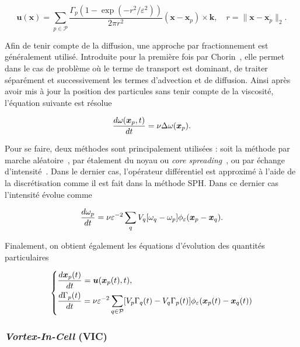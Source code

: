 \begin{equation*}
    \bm u(\bm x) = \sum_{p \in \mathcal P} \frac{\Gamma_p(1 - \exp(-r^2 / \varepsilon^2)) }{2\pi r^2} (\bm x - \bm x_p)\times \bm k, \quad r = \|\bm x - \bm x_p\|_2.
\end{equation*}

Afin de tenir compte de la diffusion, une approche par fractionnement est généralement utilisé. Introduite pour la première fois par Chorin~\cite{chorin_discretization_1973}, elle permet dans le cas de problème où le terme de transport est dominant, de traiter séparément et successivement les termes d'advection et de diffusion. Ainsi après avoir mis à jour la position des particules sans tenir compte de la viscosité, l'équation suivante est résolue

\begin{equation*}
    \frac{d\omega(\bm x_p, t)}{dt} = \nu \Delta \omega(\bm{x}_p).
\end{equation*}

Pour se faire, deux méthodes sont principalement utilisées : soit la méthode par marche aléatoire~\cite{chorin_discretization_1973}, par étalement du noyau ou \textit{core spreading}~\cite{LEONARD1980289}, ou par échange d'intensité~\cite{1989MaCom..53..485D}. Dans le dernier cas, l'opérateur différentiel est approximé à l'aide de la discrétisation comme il est fait dans la méthode SPH. Dans ce dernier cas l'intensité évolue comme

\begin{equation*}
    \frac{d \omega_p}{dt} = \nu \varepsilon^{-2} \sum_q V_q [\omega_q - \omega_p] \phi_\varepsilon(\bm{x}_p - \bm{x}_q).
\end{equation*}

Finalement, on obtient également les équations d'évolution des quantités particulaires

\begin{gather*}
    \left\{\begin{aligned}
         & \frac{d \bm{x}_p(t)}{dt} = \bm u(\bm{x}_p(t), t),                                                                                                      \\
         & \frac{d\Gamma_p(t)}{dt} = \nu \varepsilon^{-2} \sum_{q \in \mathcal P} [V_p \Gamma_q(t) - V_q \Gamma_p(t)] \phi_\varepsilon(\bm{x}_p(t) - \bm{x}_q(t))
    \end{aligned}\right.
\end{gather*}

\subsubsection{\textit{Vortex-In-Cell} (VIC)}

